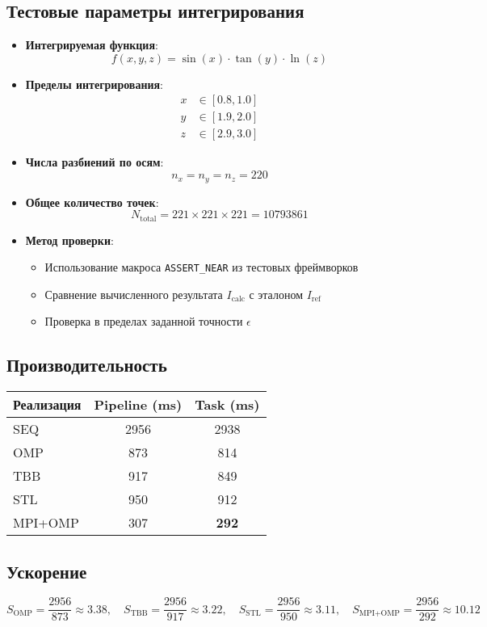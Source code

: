 \documentclass[12pt]{article}
\begin{document}
\subsection*{Тестовые параметры интегрирования}
\begin{itemize}
  \item \textbf{Интегрируемая функция}:
  \[
  f(x, y, z) = \sin(x) \cdot \tan(y) \cdot \ln(z)
  \]
  
  \item \textbf{Пределы интегрирования}:
  \begin{align*}
  x & \in [0.8, 1.0] \\
  y & \in [1.9, 2.0] \\
  z & \in [2.9, 3.0]
  \end{align*}
  
  \item \textbf{Числа разбиений по осям}:
  \[
  n_x = n_y = n_z = 220
  \]
  
  \item \textbf{Общее количество точек}:
  \[
  N_{\text{total}} = 221 \times 221 \times 221 = 10793861
  \]
  \item \textbf{Метод проверки}:
  \begin{itemize}
    \item Использование макроса \texttt{ASSERT\_NEAR} из тестовых фреймворков
    \item Сравнение вычисленного результата $I_{\text{calc}}$ с эталоном $I_{\text{ref}}$
    \item Проверка в пределах заданной точности $\epsilon$
  \end{itemize}
\end{itemize}

\subsection*{Производительность}
\begin{tabular}{|l|c|c|}
\hline
\textbf{Реализация} & \textbf{Pipeline (ms)} & \textbf{Task (ms)} \\
\hline
SEQ       & 2956 & 2938 \\
OMP       & 873 & 814 \\
TBB       & 917 & 849 \\
STL       & 950 & 912 \\
MPI+OMP   & 307 & \textbf{292} \\
\hline
\end{tabular}

\subsection*{Ускорение}
\[
S_{\text{OMP}} = \frac{2956}{873} \approx 3.38, \quad
S_{\text{TBB}} = \frac{2956}{917} \approx 3.22, \quad
S_{\text{STL}} = \frac{2956}{950} \approx 3.11, \quad
S_{\text{MPI+OMP}} = \frac{2956}{292} \approx 10.12
\]
\end{document}
